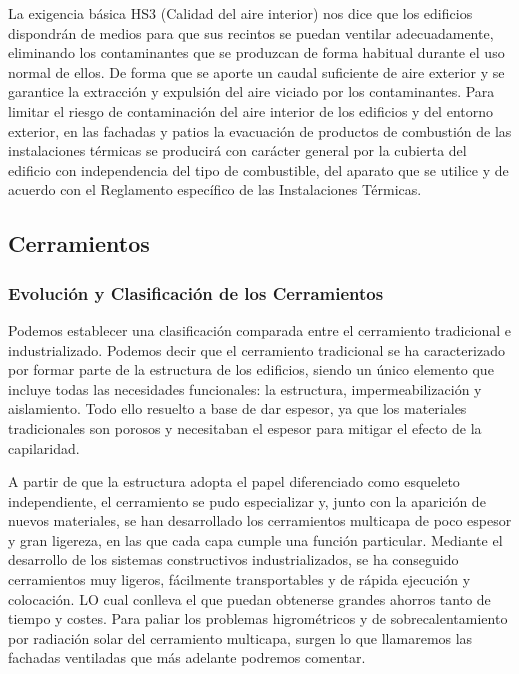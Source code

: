 \begin{itemize}
La exigencia básica HS3 (Calidad del aire interior) nos dice que los edificios dispondrán de medios para que sus recintos se puedan ventilar adecuadamente, eliminando los contaminantes que se produzcan de forma habitual durante el uso normal de ellos. De forma que se aporte un caudal suficiente de aire exterior y se garantice la extracción y expulsión del aire viciado por los contaminantes. Para limitar el riesgo de contaminación del aire interior de los edificios y del entorno exterior, en las fachadas y patios la evacuación de productos de combustión de las instalaciones térmicas se producirá con carácter general por la cubierta del edificio con independencia del tipo de combustible, del aparato que se utilice y de acuerdo con el Reglamento específico de las Instalaciones Térmicas.

\end{itemize}

\subsection{Cerramientos}

\subsubsection*{Evolución y Clasificación de los Cerramientos}

Podemos establecer una clasificación comparada entre el cerramiento tradicional e industrializado. Podemos decir que el cerramiento tradicional se ha caracterizado por formar parte de la estructura de los edificios, siendo un único elemento que incluye todas las necesidades funcionales: la estructura, impermeabilización y aislamiento. Todo ello resuelto a base de dar espesor, ya que los materiales tradicionales son porosos y necesitaban el espesor para mitigar el efecto de la capilaridad.

A partir de que la estructura adopta el papel diferenciado como esqueleto independiente, el cerramiento se pudo especializar y, junto con la aparición de nuevos materiales, se han desarrollado los cerramientos multicapa de poco espesor y gran ligereza, en las que cada capa cumple una función particular. Mediante el desarrollo de los sistemas constructivos industrializados, se ha conseguido cerramientos muy ligeros, fácilmente transportables y de rápida ejecución y colocación. LO cual conlleva el que puedan obtenerse grandes ahorros tanto de tiempo y costes. Para paliar los problemas higrométricos y de sobrecalentamiento por radiación solar del cerramiento multicapa, surgen lo que llamaremos las fachadas ventiladas que más adelante podremos comentar.

